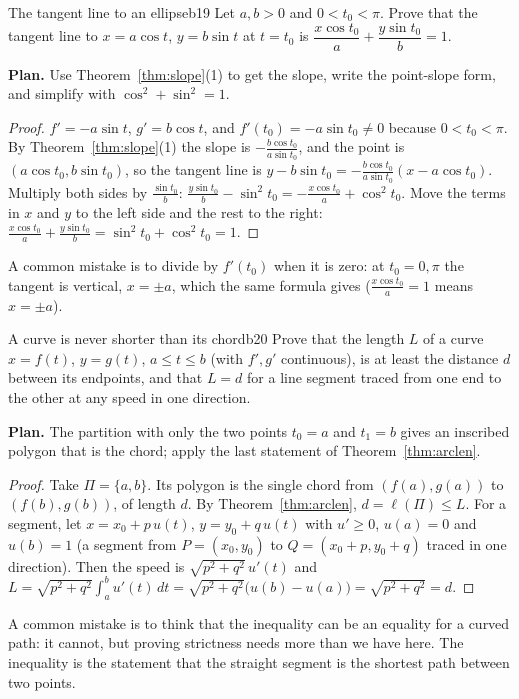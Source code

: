 \documentclass[11pt]{article}
\begin{document}
\begin{exmp}{The tangent line to an ellipse}{b19}
Let $a,b>0$ and $0<t_0<\pi$. Prove that the tangent line to $x=a\cos t$, $y=b\sin t$ at $t=t_0$ is $\dfrac{x\cos t_0}a+\dfrac{y\sin t_0}b=1$.

\textbf{Plan.} Use Theorem~\ref{thm:slope}(1) to get the slope, write the point-slope form, and simplify with $\cos^2+\sin^2=1$.

\begin{proof}
$f'=-a\sin t$, $g'=b\cos t$, and $f'(t_0)=-a\sin t_0\ne0$ because $0<t_0<\pi$. By Theorem~\ref{thm:slope}(1) the slope is $-\frac{b\cos t_0}{a\sin t_0}$, and the point is $(a\cos t_0,b\sin t_0)$, so the tangent line is $y-b\sin t_0=-\frac{b\cos t_0}{a\sin t_0}(x-a\cos t_0)$. Multiply both sides by $\frac{\sin t_0}b$: $\frac{y\sin t_0}b-\sin^2t_0=-\frac{x\cos t_0}a+\cos^2t_0$. Move the terms in $x$ and $y$ to the left side and the rest to the right: $\frac{x\cos t_0}a+\frac{y\sin t_0}b=\sin^2t_0+\cos^2t_0=1$.
\end{proof}
A common mistake is to divide by $f'(t_0)$ when it is zero: at $t_0=0,\pi$ the tangent is vertical, $x=\pm a$, which the same formula gives ($\frac{x\cos t_0}a=1$ means $x=\pm a$).
\end{exmp}

\begin{exmp}{A curve is never shorter than its chord}{b20}
Prove that the length $L$ of a curve $x=f(t)$, $y=g(t)$, $a\le t\le b$ (with $f',g'$ continuous), is at least the distance $d$ between its endpoints, and that $L=d$ for a line segment traced from one end to the other at any speed in one direction.

\textbf{Plan.} The partition with only the two points $t_0=a$ and $t_1=b$ gives an inscribed polygon that is the chord; apply the last statement of Theorem~\ref{thm:arclen}.

\begin{proof}
Take $\Pi=\{a,b\}$. Its polygon is the single chord from $(f(a),g(a))$ to $(f(b),g(b))$, of length $d$. By Theorem~\ref{thm:arclen}, $d=\ell(\Pi)\le L$. For a segment, let $x=x_0+p\,u(t)$, $y=y_0+q\,u(t)$ with $u'\ge0$, $u(a)=0$ and $u(b)=1$ (a segment from $P=(x_0,y_0)$ to $Q=(x_0+p,y_0+q)$ traced in one direction). Then the speed is $\sqrt{p^2+q^2}\,u'(t)$ and $L=\sqrt{p^2+q^2}\int_a^bu'(t)\,dt=\sqrt{p^2+q^2}\bigl(u(b)-u(a)\bigr)=\sqrt{p^2+q^2}=d$.
\end{proof}
A common mistake is to think that the inequality can be an equality for a curved path: it cannot, but proving strictness needs more than we have here. The inequality is the statement that the straight segment is the shortest path between two points.
\end{exmp}
\end{document}
